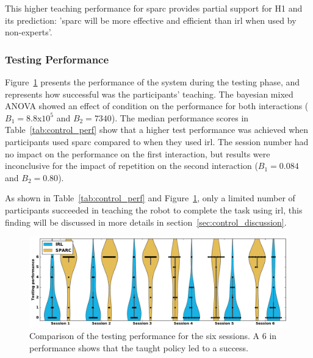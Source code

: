 This higher teaching performance for \gls{sparc} provides partial support for H1 and its prediction: '\gls{sparc} will be more effective and efficient than \gls{irl} when used by non-experts'.

\subsubsection{Testing Performance}

Figure~\ref{fig:control_perf} presents the performance of the system during the testing phase, and represents how successful was the participants' teaching. The bayesian mixed ANOVA showed an effect of condition on the performance for both interactions ($B_1=8.8$x$10^5$ and $B_2 = 7340$). The median performance scores in Table~\ref{tab:control_perf} show that a higher test performance was achieved when participants used \gls{sparc} compared to when they used \gls{irl}. The session number had no impact on the performance on the first interaction, but results were inconclusive for the impact of repetition on the second interaction ($B_1=0.084$ and $B_2=0.80$).


As shown in Table~\ref{tab:control_perf} and Figure~\ref{fig:control_perf}, only a limited number of participants succeeded in teaching the robot to complete the task using \gls{irl}, this finding will be discussed in more details in section~\ref{sec:control_discussion}.


\begin{figure}[ht]
	\includegraphics[width=\textwidth]{performance.pdf}
	\centering
	\caption{Comparison of the testing performance for the six sessions. A 6 in performance shows that the taught policy led to a success.
	}
	\label{fig:control_perf}
\end{figure}

